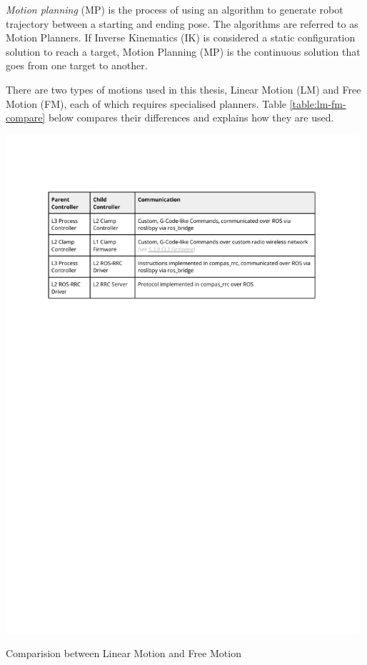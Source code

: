 \textit{Motion planning} (MP) is the process of using an algorithm to generate robot trajectory between a starting and ending pose. The algorithms are referred to as Motion Planners.  If Inverse Kinematics (IK) is considered a static configuration solution to reach a target, Motion Planning (MP) is the continuous solution that goes from one target to another. 

There are two types of motions used in this thesis, Linear Motion (LM) and Free Motion (FM), each of which requires specialised planners. Table \ref{table:lm-fm-compare} below compares their differences and explains how they are used.

\begin{table}
    \includegraphics[page=3, trim=25.4mm 160mm 25.4mm 33mm, clip, width=0.98\textwidth]{tables/Tables in Chapter 5.pdf}
    \caption{Comparision between Linear Motion and Free Motion}
    \label{table:lm-fm-compare}
\end{table}

